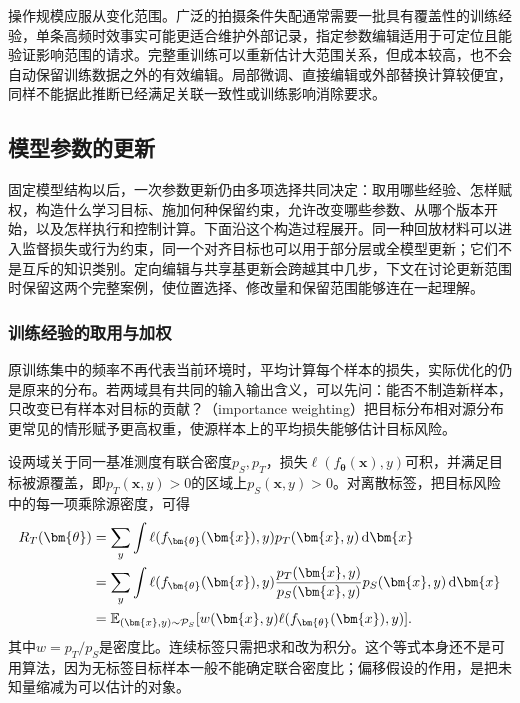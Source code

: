 操作规模应服从变化范围。广泛的拍摄条件失配通常需要一批具有覆盖性的训练经验，单条高频时效事实可能更适合维护外部记录，指定参数编辑适用于可定位且能验证影响范围的请求。完整重训练可以重新估计大范围关系，但成本较高，也不会自动保留训练数据之外的有效编辑。局部微调、直接编辑或外部替换计算较便宜，同样不能据此推断已经满足关联一致性或训练影响消除要求。

\subsection{模型参数的更新}
\label{sec:ket-update-parameters}

固定模型结构以后，一次参数更新仍由多项选择共同决定：取用哪些经验、怎样赋权，构造什么学习目标、施加何种保留约束，允许改变哪些参数、从哪个版本开始，以及怎样执行和控制计算。下面沿这个构造过程展开。同一种回放材料可以进入监督损失或行为约束，同一个对齐目标也可以用于部分层或全模型更新；它们不是互斥的知识类别。定向编辑与共享基更新会跨越其中几步，下文在讨论更新范围时保留这两个完整案例，使位置选择、修改量和保留范围能够连在一起理解。

\subsubsection{训练经验的取用与加权}
\label{sec:ket-update-weighting}

原训练集中的频率不再代表当前环境时，平均计算每个样本的损失，实际优化的仍是原来的分布。若两域具有共同的输入输出含义，可以先问：能否不制造新样本，只改变已有样本对目标的贡献？（importance weighting）把目标分布相对源分布更常见的情形赋予更高权重，使源样本上的平均损失能够估计目标风险。

设两域关于同一基准测度有联合密度$p_S,p_T$，损失$\ell(f_{\bm{\theta}}(\bm{x}),y)$可积，并满足目标被源覆盖，即$p_T(\bm{x},y)>0$的区域上$p_S(\bm{x},y)>0$。对离散标签，把目标风险中的每一项乘除源密度，可得
\begin{align}
R_T(\bm{\theta})
&=\sum_y\int \ell(f_{\bm{\theta}}(\bm{x}),y)
       p_T(\bm{x},y)\,\mathrm{d}\bm{x}\notag\\
&=\sum_y\int \ell(f_{\bm{\theta}}(\bm{x}),y)
       \frac{p_T(\bm{x},y)}{p_S(\bm{x},y)}
       p_S(\bm{x},y)\,\mathrm{d}\bm{x}\notag\\
&=\mathbb E_{(\bm{x},y)\sim\mathcal P_S}
  [w(\bm{x},y)\ell(f_{\bm{\theta}}(\bm{x}),y)].
\label{eq:ket-update-importance}
\end{align}
其中$w=p_T/p_S$是密度比。连续标签只需把求和改为积分。这个等式本身还不是可用算法，因为无标签目标样本一般不能确定联合密度比；偏移假设的作用，是把未知量缩减为可以估计的对象。

